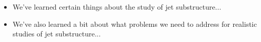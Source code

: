

\begin{itemize}
    \item
        We've learned certain things about the study of jet substructure... 

    \item
        We've also learned a bit about what problems we need to address for realistic studies of jet substructure... 
\end{itemize}


